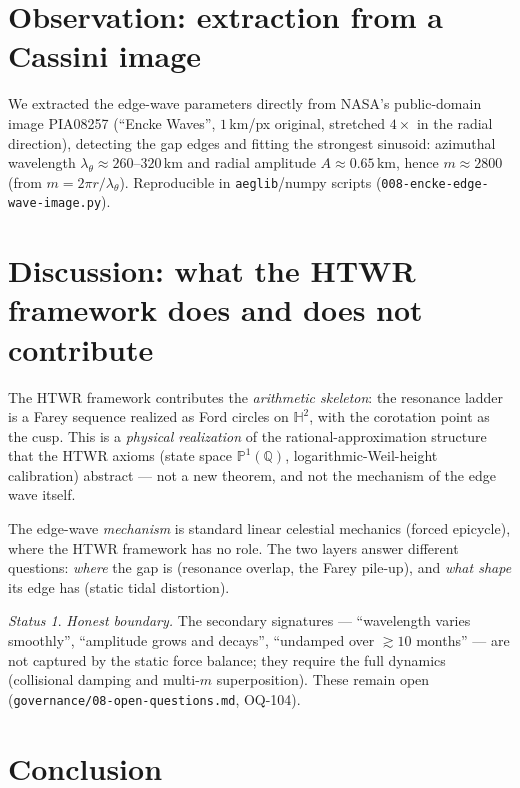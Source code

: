 \documentclass[11pt]{article}
\theoremstyle{remark}
\newtheorem*{status}{Status}
\newcommand{\Q}{\mathbb{Q}}
\newcommand{\PP}{\mathbb{P}}
\newcommand{\Ht}{\mathbb{H}}
\begin{document}
\section{Observation: extraction from a Cassini image}\label{sec:image}

We extracted the edge-wave parameters directly from NASA's public-domain image
PIA08257 (``Encke Waves'', $1$\,km/px original, stretched $4\times$ in the radial
direction), detecting the gap edges and fitting the strongest sinusoid:
azimuthal wavelength $\lambda_\theta\approx260$--$320$\,km and radial amplitude
$A\approx0.65$\,km, hence $m\approx2800$ (from $m=2\pi r/\lambda_\theta$).
Reproducible in
\texttt{aeglib}/numpy scripts (\texttt{008-encke-edge-wave-image.py}).

\section{Discussion: what the HTWR framework does and does not contribute}
\label{sec:discussion}

The HTWR framework contributes the \emph{arithmetic skeleton}: the resonance
ladder is a Farey sequence realized as Ford circles on $\Ht^2$, with the
corotation point as the cusp.  This is a \emph{physical realization} of the
rational-approximation structure that the HTWR axioms (state space
$\PP^1(\Q)$, logarithmic-Weil-height calibration) abstract --- not a new theorem,
and not the mechanism of the edge wave itself.

The edge-wave \emph{mechanism} is standard linear celestial mechanics (forced
epicycle), where the HTWR framework has no role.  The two layers answer
different questions: \emph{where} the gap is (resonance overlap, the Farey
pile-up), and \emph{what shape} its edge has (static tidal distortion).

\begin{status}
\emph{Honest boundary.} The secondary signatures --- ``wavelength varies
smoothly'', ``amplitude grows and decays'', ``undamped over $\gtrsim10$ months''
--- are not captured by the static force balance; they require the full dynamics
(collisional damping and multi-$m$ superposition).  These remain open
(\texttt{governance/08-open-questions.md}, OQ-104).
\end{status}

\section{Conclusion}\label{sec:conclusion}
\end{document}
